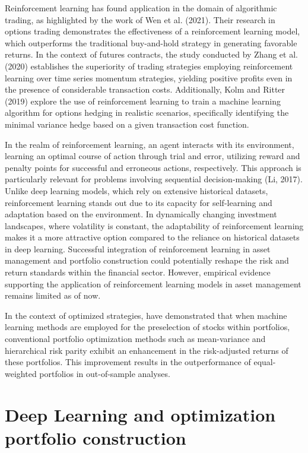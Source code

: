 Reinforcement learning has found application in the domain of algorithmic trading, as highlighted by the work of Wen et al. (2021). Their research in options trading demonstrates the effectiveness of a reinforcement learning model, which outperforms the traditional buy-and-hold strategy in generating favorable returns. In the context of futures contracts, the study conducted by Zhang et al. (2020) establishes the superiority of trading strategies employing reinforcement learning over time series momentum strategies, yielding positive profits even in the presence of considerable transaction costs. Additionally, Kolm and Ritter (2019) explore the use of reinforcement learning to train a machine learning algorithm for options hedging in realistic scenarios, specifically identifying the minimal variance hedge based on a given transaction cost function.

In the realm of reinforcement learning, an agent interacts with its environment, learning an optimal course of action through trial and error, utilizing reward and penalty points for successful and erroneous actions, respectively. This approach is particularly relevant for problems involving sequential decision-making (Li, 2017). Unlike deep learning models, which rely on extensive historical datasets, reinforcement learning stands out due to its capacity for self-learning and adaptation based on the environment. In dynamically changing investment landscapes, where volatility is constant, the adaptability of reinforcement learning makes it a more attractive option compared to the reliance on historical datasets in deep learning. Successful integration of reinforcement learning in asset management and portfolio construction could potentially reshape the risk and return standards within the financial sector. However, empirical evidence supporting the application of reinforcement learning models in asset management remains limited as of now.

In the context of optimized strategies, \citep{Kaczmarek20211} have demonstrated that when machine learning methods are employed for the preselection of stocks within portfolios, conventional portfolio optimization methods such as mean-variance and hierarchical risk parity exhibit an enhancement in the risk-adjusted returns of these portfolios. This improvement results in the outperformance of equal-weighted portfolios in out-of-sample analyses.

\section{Deep Learning and optimization portfolio construction}

